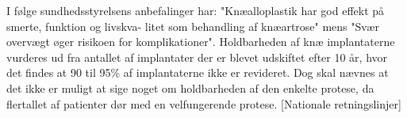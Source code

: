 I følge sundhedsstyrelsens anbefalinger har: "Knæalloplastik har god effekt på smerte, funktion og livskva- litet som behandling af knæartrose" mens "Svær overvægt øger risikoen for komplikationer". Holdbarheden af knæ implantaterne vurderes ud fra antallet af implantater der er blevet udskiftet efter 10 år, hvor det findes at 90 til 95\% af implantaterne ikke er revideret. Dog skal nævnes at det ikke er muligt at sige noget om holdbarheden af den enkelte protese, da flertallet af patienter dør med en velfungerende protese. [Nationale retningslinjer]
%
%
%
